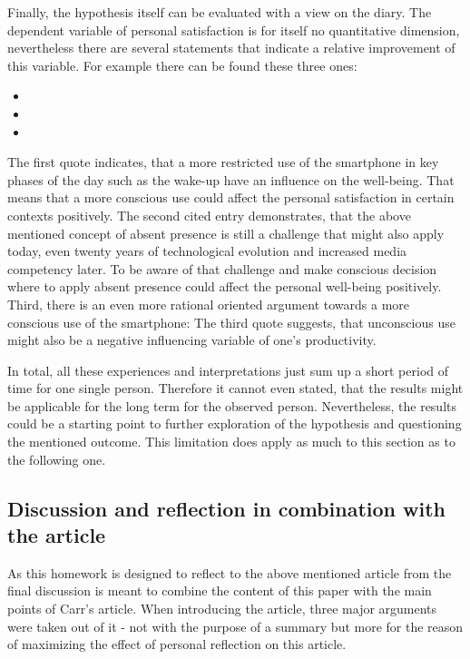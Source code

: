 Finally, the hypothesis itself can be evaluated with a view on the diary. The dependent variable of personal satisfaction is for itself no quantitative dimension, nevertheless there are several statements that indicate a relative improvement of this variable. For example there can be found these three ones:

\begin{itemize}
\item {}
\item {}
\item {}
\end{itemize}

The first quote indicates, that a more restricted use of the smartphone in key phases of the day such as the wake-up have an influence on the well-being. That means that a more conscious use could affect the personal satisfaction in certain contexts positively. The second cited entry demonstrates, that the above mentioned concept of absent presence \cite{Gergen.2002} is still a challenge that might also apply today, even twenty years of technological evolution and increased media competency later. To be aware of that challenge and make conscious decision where to apply absent presence could affect the personal well-being positively. Third, there is an even more rational oriented argument towards a more conscious use of the smartphone: The third quote suggests, that unconscious use might also be a negative influencing variable of one's productivity.

In total, all these experiences and interpretations just sum up a short period of time for one single person. Therefore it cannot even stated, that the results might be applicable for the long term for the observed person. Nevertheless, the results could be a starting point to further exploration of the hypothesis and questioning the mentioned outcome. This limitation does apply as much to this section as to the following one.

\subsection*{Discussion and reflection in combination with the article}
As this homework is designed to reflect to the above mentioned article  from \cite{Carr.2008} the final discussion is meant to combine the content of this paper with the main points of Carr's article. When introducing the article, three major arguments were taken out of it - not with the purpose of a summary but more for the reason of maximizing the effect of personal reflection on this article.


